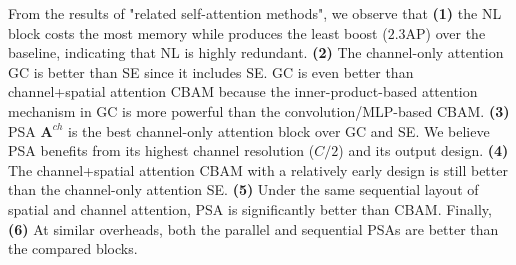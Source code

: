 \documentclass[10pt,twocolumn,letterpaper]{article}
\newcommand{\A}{\mathbf{A}}
\begin{document}
From the results of "related self-attention methods", we observe that \textbf{(1)} the NL block costs the most memory while produces the least boost ($2.3$AP) over the baseline, indicating that NL is highly redundant. \textbf{(2)} The channel-only attention GC is better than SE since it includes SE. GC is even better than channel+spatial attention CBAM because the inner-product-based attention mechanism in GC is more powerful than the convolution/MLP-based CBAM. \textbf{(3)} PSA $\A^{ch}$ is the best channel-only attention block over GC and SE. We believe PSA benefits from its highest channel resolution ($C/2$) and its output design. \textbf{(4)} The channel+spatial attention CBAM with a relatively early design is still better than the channel-only attention SE. \textbf{(5)} Under the same sequential layout of spatial and channel attention, PSA is significantly better than CBAM. Finally, \textbf{(6)} At similar overheads, both the parallel and sequential PSAs are better than the compared blocks.
\end{document}
